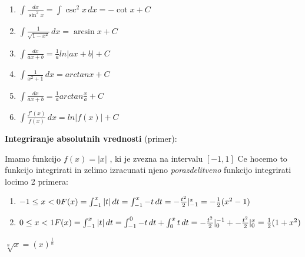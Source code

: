 \begin{center}
\begin{small}
\begin{enumerate}
            \item \begin{math}
                \int \frac{dx}{\sin^2 x}=\int \csc^2 x \, dx = -\cot x + C
            \end{math}
            \item \begin{math}
                \int {\frac{1}{\sqrt{1-x^2}}} \, dx = \arcsin {x} + C
            \end{math}
            \item \begin{math}
                \int \frac{dx}{ax + b} = \frac{1}{a} ln |ax + b| + C
            \end{math}
            \item \begin{math}
                \int \frac{1}{x^2 + 1} \, dx = arctan x + C
            \end{math}
            \item \begin{math}
                \int \frac{dx}{ax + b} = \frac{1}{a} arctan \frac{x}{a} + C
            \end{math}
            \item \begin{math}
                \int \frac{f'(x)}{f(x)} \, dx = ln|f(x)| + C
            \end{math}
        \end{enumerate}
    \end{small}
\end{center}
    \textbf{Integriranje absolutnih vrednosti} (primer):
    \begin{small}
        Imamo funkcijo $f(x) = |x|$ , ki je zvezna na intervalu $[-1, 1]$
        Ce hocemo to funkcijo integrirati in zelimo izracunati njeno 
        \textit{porazdelitveno} funkcijo integrirati locimo 2 primera:    
    \end{small}
    \begin{enumerate}
        \item \begin{math}
            -1 \leq x < 0\\
            F(x) = \int_{-1}^x |t|\,dt = \int_{-1}^x -t\,dt = - \frac{t^2}{2} \rvert_{-1}^{x} = - \frac{1}{2} (x^2 -1)
        \end{math}
        \item \begin{math}
            0 \leq x < 1 \\
            F(x) = \int_{-1}^x |t|\,dt = \int_{-1}^0 -t\,dt + \int_{0}^x t\,dt = - \frac{t^2}{2} \rvert_{0}^{-1} + - \frac{t^2}{2} \rvert_{0}^{x}= \frac{1}{2} (1 + x^2)
        \end{math}
    \end{enumerate}
\begin{small}
    \begin{math}
        \sqrt[n] x = (x)^{\frac{1}{n}}
    \end{math}    
\end{small}
